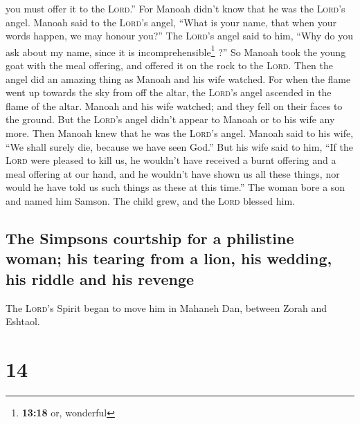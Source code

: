 you must offer it to the \textsc{Lord}.'' For Manoah didn't know that he
was the \textsc{Lord}'s angel.  Manoah said to the
\textsc{Lord}'s angel, ``What is your name, that when your words happen,
we may honour you?''  The \textsc{Lord}'s angel said to
him, ``Why do you ask about my name, since it is
incomprehensible\footnote{\textbf{13:18} or, wonderful} ?''
 So Manoah took the young goat with the meal offering,
and offered it on the rock to the \textsc{Lord}. Then the angel did an
amazing thing as Manoah and his wife watched.  For when
the flame went up towards the sky from off the altar, the
\textsc{Lord}'s angel ascended in the flame of the altar. Manoah and his
wife watched; and they fell on their faces to the ground.
 But the \textsc{Lord}'s angel didn't appear to Manoah or
to his wife any more. Then Manoah knew that he was the \textsc{Lord}'s
angel.  Manoah said to his wife, ``We shall surely die,
because we have seen God.''  But his wife said to him,
``If the \textsc{Lord} were pleased to kill us, he wouldn't have
received a burnt offering and a meal offering at our hand, and he
wouldn't have shown us all these things, nor would he have told us such
things as these at this time.''  The woman bore a son and
named him Samson. The child grew, and the \textsc{Lord} blessed him.

\hypertarget{the-simpsons-courtship-for-a-philistine-woman-his-tearing-from-a-lion-his-wedding-his-riddle-and-his-revenge}{%
\subsection{The Simpsons courtship for a philistine woman; his tearing
from a lion, his wedding, his riddle and his
revenge}\label{the-simpsons-courtship-for-a-philistine-woman-his-tearing-from-a-lion-his-wedding-his-riddle-and-his-revenge}}

 The \textsc{Lord}'s Spirit began to move him in Mahaneh
Dan, between Zorah and Eshtaol.

\hypertarget{section-13}{%
\section{14}\label{section-13}}

